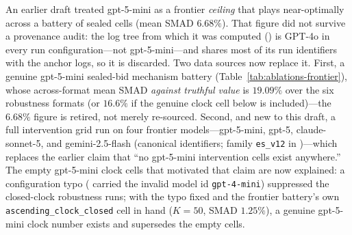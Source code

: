An earlier draft treated gpt-5-mini as a frontier \emph{ceiling} that plays near-optimally across a battery of sealed cells (mean SMAD $6.68\%$). That figure did not survive a provenance audit: the log tree from which it was computed () is GPT-4o in every run configuration---not gpt-5-mini---and shares most of its run identifiers with the anchor logs, so it is discarded. Two data sources now replace it. First, a genuine gpt-5-mini sealed-bid mechanism battery (Table~\ref{tab:ablations-frontier}), whose across-format mean SMAD \emph{against truthful value} is $19.09\%$ over the six robustness formats (or $16.6\%$ if the genuine clock cell below is included)---the $6.68\%$ figure is retired, not merely re-sourced. Second, and new to this draft, a full intervention grid run on four frontier models---gpt-5-mini, gpt-5, claude-sonnet-5, and gemini-2.5-flash (canonical identifiers; family \texttt{es\_v12} in )---which replaces the earlier claim that ``no gpt-5-mini intervention cells exist anywhere.'' The empty gpt-5-mini clock cells that motivated that claim are now explained: a configuration typo ( carried the invalid model id \texttt{gpt-4-mini}) suppressed the closed-clock robustness runs; with the typo fixed and the frontier battery's own \texttt{ascending\_clock\_closed} cell in hand ($K=50$, SMAD $1.25\%$), a genuine gpt-5-mini clock number exists and supersedes the empty cells.

